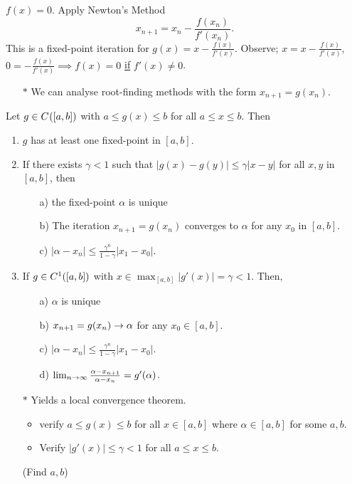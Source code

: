 \documentclass[]{article}
\begin{document}
\begin{example}
	$f(x)=0$. Apply Newton's Method $$x_{n+1} = x_n - \frac{f(x_n)}{f'(x_n)}.$$
	This is a fixed-point iteration for $g(x) = x-\frac{f(x)}{f'(x)}$.
	Observe; $x = x-\frac{f(x)}{f'(x)}$, $0 = -\frac{f(x)}{f'(x)} \implies f(x)=0$ \ul{if} $f'(x)\neq0$.
	\begin{enumerate}
		\item[$*$] We can analyse root-finding methods with the form $x_{n+1}=g(x_n)$.
	\end{enumerate}
\end{example}
\begin{theorem}
	Let $g\in C^{}({[}a,b{]})$ with $a\leq g(x)\leq b$ for all $a\leq x\leq b$. Then
	\begin{enumerate}
		\item $g$ has at least one fixed-point in $[a,b]$.
		\item If there exists $\gamma<1$ such that $|g(x)-g(y)|\leq \gamma|x-y|$ for all $x,y$ in $[a,b]$, then
			\begin{enumerate}
				\item[a)] the fixed-point $\alpha$ is unique
				\item[b)] The iteration $x_{n+1}=g(x_n)$ converges to $\alpha$ for any $x_0$ in $[a,b]$.
				\item[c)] $|\alpha-x_n|\leq \frac{\gamma^n}{1-\gamma}|x_1-x_0|$.
			\end{enumerate}
		\item If $g\in C^{1}({[}a,b{]})$ with $x\in\max_{[a,b]}|g'(x)| = \gamma<1$. Then,
			\begin{enumerate}
				\item[a)] $\alpha$ is unique
				\item[b)] $x_{n+1} = g(x_n) \rightarrow\alpha$ for any $x_0\in[a,b]$.
				\item[c)] $|\alpha-x_n| \leq \frac{\gamma^n}{1-\gamma} |x_1-x_0|$.
				\item[d)] $\lim_{n\rightarrow\infty} \frac{\alpha-x_{n+1}}{\alpha-x_n} = g'(\alpha)$.
			\end{enumerate}
		\item[$*$] Yields a local convergence theorem.
			\begin{itemize}
				\item verify $a\leq g(x)\leq b$ for all $x\in[a,b]$ where $\alpha\in[a,b]$ for some $a,b$.
				\item Verify $|g'(x)|\leq\gamma<1$ for all $a\leq x\leq b$.
			\end{itemize}
			(Find $a,b$)
	\end{enumerate}
\end{theorem}
\end{document}
